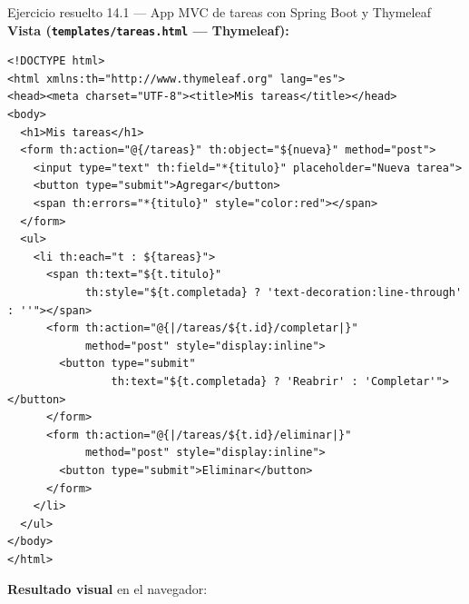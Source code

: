 \begin{cajaejemplo}{Ejercicio resuelto 14.1 --- App MVC de tareas con Spring Boot y Thymeleaf}
\textbf{Vista (\texttt{templates/tareas.html} --- Thymeleaf):}
\begin{lstlisting}[language=HTML5,caption={Ejemplo de HTML},label=lst:14.13]
<!DOCTYPE html>
<html xmlns:th="http://www.thymeleaf.org" lang="es">
<head><meta charset="UTF-8"><title>Mis tareas</title></head>
<body>
  <h1>Mis tareas</h1>
  <form th:action="@{/tareas}" th:object="${nueva}" method="post">
    <input type="text" th:field="*{titulo}" placeholder="Nueva tarea">
    <button type="submit">Agregar</button>
    <span th:errors="*{titulo}" style="color:red"></span>
  </form>
  <ul>
    <li th:each="t : ${tareas}">
      <span th:text="${t.titulo}"
            th:style="${t.completada} ? 'text-decoration:line-through' : ''"></span>
      <form th:action="@{|/tareas/${t.id}/completar|}"
            method="post" style="display:inline">
        <button type="submit"
                th:text="${t.completada} ? 'Reabrir' : 'Completar'"></button>
      </form>
      <form th:action="@{|/tareas/${t.id}/eliminar|}"
            method="post" style="display:inline">
        <button type="submit">Eliminar</button>
      </form>
    </li>
  </ul>
</body>
</html>
\end{lstlisting}

\textbf{Resultado visual} en el navegador:

\begin{center}
\end{center}


\end{cajaejemplo}
